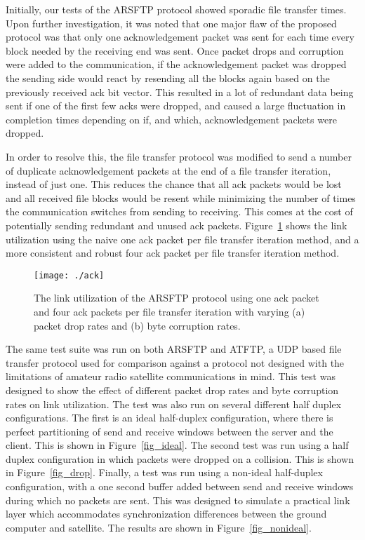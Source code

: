 \documentclass[journal]{./IEEEtran}
\begin{document}
Initially, our tests of the ARSFTP protocol showed sporadic file transfer times.  Upon further investigation, it was noted that one major flaw of the proposed protocol was that only one acknowledgement packet was sent for each time every block needed by the receiving end was sent.  Once packet drops and corruption were added to the communication, if the acknowledgement packet was dropped the sending side would react by resending all the blocks again based on the previously received ack bit vector.  This resulted in a lot of redundant data being sent if one of the first few acks were dropped, and caused a large fluctuation in completion times depending on if, and which, acknowledgement packets were dropped.  

In order to resolve this, the file transfer protocol was modified to send a number of duplicate acknowledgement packets at the end of a file transfer iteration, instead of just one.  This reduces the chance that all ack packets would be lost and all received file blocks would be resent while minimizing the number of times the communication switches from sending to receiving.  This comes at the cost of potentially sending redundant and unused ack packets.  Figure~\ref{fig_acks} shows the link utilization using the naive one ack packet per file transfer iteration method, and a more consistent and robust four ack packet per file transfer iteration method.

\begin{figure}[!ht]
\begin{center}
\texttt{[image: ./ack]}
\end{center}
\caption{The link utilization of the ARSFTP protocol using one ack packet and four ack packets per file transfer iteration with varying (a) packet drop rates and (b) byte corruption rates.}
\label{fig_acks}
\end{figure}

The same test suite was run on both ARSFTP and ATFTP, a UDP based file transfer protocol used for comparison against a protocol not designed with the limitations of amateur radio satellite communications in mind.  This test was designed to show the effect of different packet drop rates and byte corruption rates on link utilization.  The test was also run on several different half duplex configurations.  The first is an ideal half-duplex configuration, where there is perfect partitioning of send and receive windows between the server and the client.  This is shown in Figure~\ref{fig_ideal}.  The second test was run using a half duplex configuration in which packets were dropped on a collision.  This is shown in Figure~\ref{fig_drop}.  Finally, a test was run using a non-ideal half-duplex configuration, with a one second buffer added between send and receive windows during which no packets are sent.  This was designed to simulate a practical link layer which accommodates synchronization differences between the ground computer and satellite.  The results are shown in Figure~\ref{fig_nonideal}.
\end{document}
